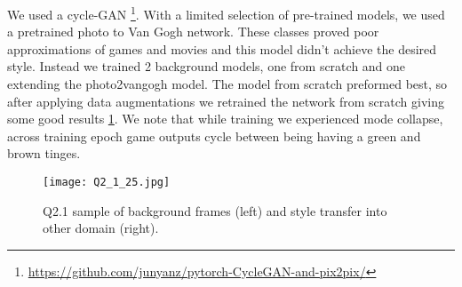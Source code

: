 We used a cycle-GAN
\footnote{\url{https://github.com/junyanz/pytorch-CycleGAN-and-pix2pix/}}.
With a limited selection of pre-trained models, we used a pretrained photo to Van Gogh network.
These classes proved poor approximations of games and movies and this model didn't achieve the desired style.
Instead we trained 2 background models, one from scratch and one extending the photo2vangogh model.
The model from scratch preformed best, so after applying data augmentations we retrained the network from scratch giving some good results \ref{fig:Q2_1}.
We note that while training we experienced mode collapse, across training epoch game outputs cycle between being having a green and brown tinges.

\begin{figure}[h!]
  \begin{center}
  \texttt{[image: Q2\_1\_25.jpg]}
    \caption{Q2.1 sample of background frames (left) and style transfer into other domain (right).}
    \label{fig:Q2_1}
  \end{center}
  \end{figure}
